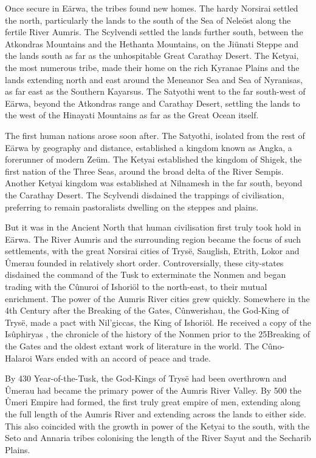 \documentclass[]{book}
\begin{document}
Once secure in Eärwa, the tribes found new homes. The hardy Norsirai settled the
north, particularly the lands to the south of the Sea of Neleöst along the fertile River
Aumris. The Scylvendi settled the lands further south, between the Atkondras
Mountains and the Hethanta Mountains, on the Jiünati Steppe and the lands south as
far as the unhospitable Great Carathay Desert. The Ketyai, the most numerous tribe,
made their home on the rich Kyranae Plains and the lands extending north and east
around the Meneanor Sea and Sea of Nyranisas, as far east as the Southern Kayarsus.
The Satyothi went to the far south-west of Eärwa, beyond the Atkondras range and
Carathay Desert, settling the lands to the west of the Hinayati Mountains as far as the
Great Ocean itself.

The first human nations arose soon after. The Satyothi, isolated from the rest of Eärwa
by geography and distance, established a kingdom known as Angka, a forerunner of
modern Zeüm. The Ketyai established the kingdom of Shigek, the first nation of the
Three Seas, around the broad delta of the River Sempis. Another Ketyai kingdom was
established at Nilnamesh in the far south, beyond the Carathay Desert. The Scylvendi
disdained the trappings of civilisation, preferring to remain pastoralists dwelling on the
steppes and plains.

But it was in the Ancient North that human civilisation first truly took hold in Eärwa.
The River Aumris and the surrounding region became the focus of such settlements,
with the great Norsirai cities of Trysë, Sauglish, Etrith, Lokor and Ûmerau founded in
relatively short order. Controversially, these city-states disdained the command of the
Tusk to exterminate the Nonmen and began trading with the Cûnuroi of Ishoriöl to
the north-east, to their mutual enrichment. The power of the Aumris River cities grew
quickly. Somewhere in the 4th Century after the Breaking of the Gates, Cûnwerishau,
the God-King of Trysë, made a pact with Nil'giccas, the King of Ishoriöl. He received a
copy of the Isûphiryas , the chronicle of the history of the Nonmen prior to the
25Breaking of the Gates and the oldest extant work of literature in the world. The Cûno-
Halaroi Wars ended with an accord of peace and trade.

By 430 Year-of-the-Tusk, the God-Kings of Trysë had been overthrown and Ûmerau
had became the primary power of the Aumris River Valley. By 500 the Ûmeri Empire
had formed, the first truly great empire of men, extending along the full length of the
Aumris River and extending across the lands to either side. This also coincided with the
growth in power of the Ketyai to the south, with the Seto and Annaria tribes colonising
the length of the River Sayut and the Secharib Plains.
\end{document}
